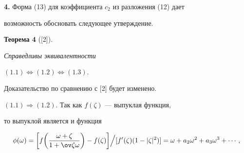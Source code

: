 

\addtocounter{equation}{-1}


 


{\bf 4.} Форма (13) для коэффициента $c_2$ из разложения (12) дает 


возможность обосновать следующее утверждение. 


\medskip 


 


{\bf Теорема 4} ([2]). {\it Справедливы эквивалентности 


$(1.1)\Leftrightarrow(1.2)\Leftrightarrow(1.3)$.} 


\medskip 


 


Доказательство по сравнению с [2] будет изменено. 


 


$(1.1)\Rightarrow(1.2)$. Так как $f(\zeta)$ --- выпуклая функция, 


то выпуклой является и функция 


\begin{equation} 


\phi(\omega)=\bigg[f\bigg(\frac{\omega+\zeta}{1+\ov\zeta\omega} 


\bigg)-f(\zeta)\bigg]\Big/ [f'(\zeta)(1-|\zeta|^2)]= 


\omega+a_2\omega^2+a_3\omega^3+\dotsb, 


\end{equation} 


